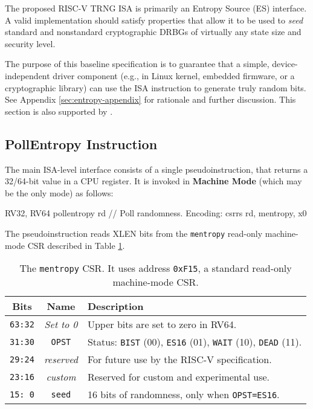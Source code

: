 \label{sec:entropy-source}

    The proposed RISC-V TRNG ISA is primarily an Entropy Source (ES)
    interface. A valid implementation should satisfy properties that allow
    it to be used to \emph{seed} standard and nonstandard cryptographic
    DRBGs of virtually any state size and security level.

    The purpose of this baseline specification is to guarantee that a simple,
    device-independent driver component (e.g., in Linux kernel, embedded
    firmware, or a cryptographic library) can use the ISA instruction to
    generate truly random bits. See Appendix \ref{sec:entropy-appendix} for
    rationale and further discussion. This section is also supported by
    \cite{SaNeMa20}.

\subsection{PollEntropy Instruction}
\label{sec:es-pollentropy}

    The main ISA-level interface consists of a single pseudoinstruction,
     that returns a 32/64-bit value in a CPU register.
    It is invoked in {\bf Machine Mode} (which may be the only mode) as
    follows:

\begin{cryptoisa}
RV32, RV64
    pollentropy    rd   // Poll randomness. Encoding: csrrs rd, mentropy, x0
\end{cryptoisa}
    The  pseudoinstruction reads XLEN bits from the
    {\tt mentropy} read-only machine-mode CSR
    described in Table \ref{tab:mentropy}.

    \begin{table}[h!]
    \begin{center}
    \begin{tabular}{ccl}
    \toprule
    Bits    & Name  & Description \\
    \midrule
    \verb|63:32|    & {\it Set to 0}
            & Upper bits are set to zero in RV64. \\
    \verb|31:30|    & \verb|OPST|
            & Status:   \verb|BIST| (00), \verb|ES16| (01),
                        \verb|WAIT| (10),   \verb|DEAD| (11). \\
    \verb|29:24|    & {\it reserved}
            & For future use by the RISC-V specification. \\
    \verb|23:16|    & {\it custom}
            & Reserved for custom and experimental use. \\
    \verb|15: 0|    & \verb|seed|
            & 16 bits of randomness, only when \verb|OPST=ES16|.    \\
    \bottomrule
    \end{tabular}
    \caption{
        The {\tt mentropy} CSR.
        It uses address {\tt 0xF15}, a standard read-only machine-mode CSR.
    }
    \label{tab:mentropy}
    \end{center}
    \end{table}

